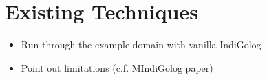 \chapter{Existing Techniques}\label{ch:golog}

\begin{itemize}
\item Run through the example domain with vanilla IndiGolog
\item Point out limitations (c.f. MIndiGolog paper)
\end{itemize}

